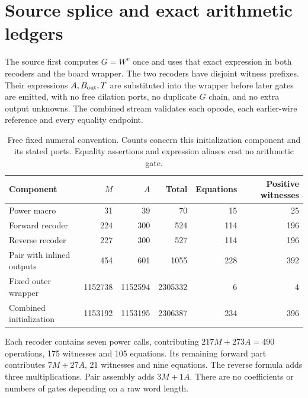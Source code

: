 \documentclass[11pt,letterpaper]{article}
\theoremstyle{definition}\newtheorem{definition}[theorem]{Definition}
\theoremstyle{remark}\newtheorem{remark}[theorem]{Remark}
\begin{document}
\section{Source splice and exact arithmetic ledgers}\label{ptr:ai:sec:ledger}
The source first computes $G=W^v$ once and uses that exact expression in both recoders and the board wrapper. The two recoders have disjoint witness prefixes. Their expressions $A,B_{\rm out},T$ are substituted into the wrapper before later gates are emitted, with no free dilation ports, no duplicate $G$ chain, and no extra output unknowns. The combined stream validates each opcode, each earlier-wire reference and every equality endpoint.

\begin{table}[ht]
\centering\small
\begin{tabular}{lrrrrr}
\toprule
Component & $M$ & $A$ & Total & Equations & Positive witnesses\\
\midrule
Power macro &31&39&70&15&25\\
Forward recoder &224&300&524&114&196\\
Reverse recoder &227&300&527&114&196\\
Pair with inlined outputs &454&601&1055&228&392\\
Fixed outer wrapper &1152738&1152594&2305332&6&4\\
\midrule
Combined initialization &1153192&1153195&2306387&234&396\\
\bottomrule
\end{tabular}
\caption{Free fixed numeral convention. Counts concern this initialization component and its stated ports. Equality assertions and expression aliases cost no arithmetic gate.}
\label{ptr:ai:tab:ledger}
\end{table}
Each recoder contains seven power calls, contributing $217M+273A=490$ operations, 175 witnesses and 105 equations. Its remaining forward part contributes $7M+27A$, 21 witnesses and nine equations. The reverse formula adds three multiplications. Pair assembly adds $3M+1A$. There are no coefficients or numbers of gates depending on a raw word length.
\end{document}

